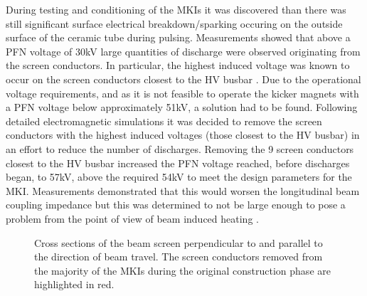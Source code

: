 During testing and conditioning of the MKIs it was discovered than there was still significant surface electrical breakdown/sparking occuring on the outside surface of the ceramic tube during pulsing. Measurements showed that above a PFN voltage of 30kV large quantities of discharge were observed originating from the screen conductors. In particular, the highest induced voltage was known to occur on the screen conductors closest to the HV busbar \cite{Barnes:improvBeamScreen}. Due to the operational voltage requirements, and as it is not feasible to operate the kicker magnets with a PFN voltage below approximately 51kV, a solution had to be found. Following detailed electromagnetic simulations it was decided to remove the screen conductors with the highest induced voltages (those closest to the HV busbar) in an effort to reduce the number of discharges. Removing the 9 screen conductors closest to the HV busbar increased the PFN voltage reached, before discharges began, to 57kV, above the required 54kV to meet the design parameters for the MKI. Measurements demonstrated that this would worsen the longitudinal beam coupling impedance but this was determined to not be large enough to pose a problem from the point of view of beam induced heating \cite{Barnes:improvBeamScreen}.

\begin{figure}
\caption{Cross sections of the beam screen perpendicular to  and parallel to  the direction of beam travel. The screen conductors removed from the majority of the MKIs during the original construction phase are highlighted in red.}
\label{fig:beamScreenCross}
\end{figure}

